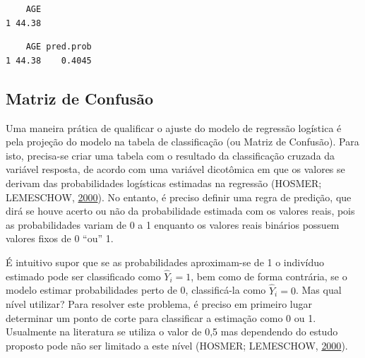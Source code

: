 \documentclass[12pt,brazil,oneside]{book}
\newenvironment{Shaded}{\begin{snugshade}}{\end{snugshade}}
\newcommand{\DataTypeTok}[1]{\textcolor[rgb]{0.13,0.29,0.53}{#1}}
\newcommand{\KeywordTok}[1]{\textcolor[rgb]{0.13,0.29,0.53}{\textbf{#1}}}
\newcommand{\NormalTok}[1]{#1}
\newcommand{\OperatorTok}[1]{\textcolor[rgb]{0.81,0.36,0.00}{\textbf{#1}}}
\newcommand{\StringTok}[1]{\textcolor[rgb]{0.31,0.60,0.02}{#1}}
\begin{document}
\begin{Shaded}
\end{Shaded}

\begin{verbatim}
    AGE
1 44.38
\end{verbatim}

\begin{Shaded}
\end{Shaded}

\begin{verbatim}
    AGE pred.prob
1 44.38    0.4045
\end{verbatim}

\hypertarget{matriz-de-confusao}{%
\subsection{Matriz de Confusão}\label{matriz-de-confusao}}

Uma maneira prática de qualificar o ajuste do modelo de regressão
logística é pela projeção do modelo na tabela de classificação (ou
Matriz de Confusão). Para isto, precisa-se criar uma tabela com o
resultado da classificação cruzada da variável resposta, de acordo com
uma variável dicotômica em que os valores se derivam das probabilidades
logísticas estimadas na regressão (HOSMER; LEMESCHOW,
\protect\hyperlink{ref-Hosmer2000}{2000}). No entanto, é preciso definir
uma regra de predição, que dirá se houve acerto ou não da probabilidade
estimada com os valores reais, pois as probabilidades variam de 0 a 1
enquanto os valores reais binários possuem valores fixos de 0 ``ou'' 1.

É intuitivo supor que se as probabilidades aproximam-se de 1 o indivíduo
estimado pode ser classificado como \(\hat Y_i=1\), bem como de forma
contrária, se o modelo estimar probabilidades perto de 0, classificá-la
como \(\hat Y_i=0\). Mas qual nível utilizar? Para resolver este
problema, é preciso em primeiro lugar determinar um ponto de corte para
classificar a estimação como 0 ou 1. Usualmente na literatura se utiliza
o valor de 0,5 mas dependendo do estudo proposto pode não ser limitado a
este nível (HOSMER; LEMESCHOW,
\protect\hyperlink{ref-Hosmer2000}{2000}).
\end{document}

